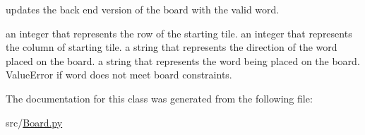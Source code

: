 updates the back end version of the board with the valid word. 

an integer that represents the row of the starting tile.  an integer that represents the column of starting tile.  a string that represents the direction of the word placed on the board.  a string that represents the word being placed on the board.  Value\+Error if word does not meet board constraints. 

The documentation for this class was generated from the following file\+:\begin{DoxyCompactItemize}
\item 
src/\hyperlink{_board_8py}{Board.\+py}\end{DoxyCompactItemize}
